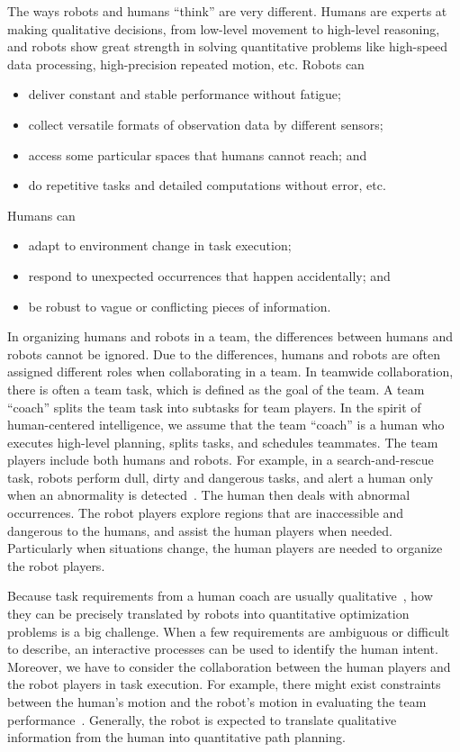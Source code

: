 \documentclass[phd]{byuprop}
\begin{document}
The ways robots and humans ``think'' are very different.
Humans are experts at making qualitative decisions, from low-level movement to high-level reasoning,
and robots show great strength in solving quantitative problems like high-speed data processing, high-precision repeated motion, etc.
Robots can
\begin{itemize}
\item deliver constant and stable performance without fatigue;
\item collect versatile formats of observation data by different sensors;
\item access some particular spaces that humans cannot reach; and
\item do repetitive tasks and detailed computations without error, etc.
\end{itemize}
Humans can
\begin{itemize}
\item adapt to environment change in task execution;
\item respond to unexpected occurrences that happen accidentally; and
\item be robust to vague or conflicting pieces of information. 
\end{itemize}
In organizing humans and robots in a team, the differences between humans and robots cannot be ignored.
Due to the differences, humans and robots are often assigned different roles when collaborating in a team.
In teamwide collaboration, there is often a team task, which is defined as the goal of the team.
A team ``coach'' splits the team task into subtasks for team players.
In the spirit of human-centered intelligence, we assume that the team ``coach'' is a human who executes high-level planning, splits tasks, and schedules teammates.
The team players include both humans and robots.
For example, in a search-and-rescue task, robots perform dull, dirty and dangerous tasks, and alert a human only when an abnormality is detected~\cite{Nourbakhsh2005}.
The human then deals with abnormal occurrences.
The robot players explore regions that are inaccessible and dangerous to the humans, and assist the human players when needed.
Particularly when situations change, the human players are needed to organize the robot players.

Because task requirements from a human coach are usually qualitative~\cite{brenner2007mediating}, how they can be precisely translated by robots into quantitative optimization problems is a big challenge.
When a few requirements are ambiguous or difficult to describe, an interactive processes can be used to identify the human intent.
Moreover, we have to consider the collaboration between the human players and the robot players in task execution.
For example, there might exist constraints between the human's motion and the robot's motion in evaluating the team performance~\cite{Yi2014a}.
Generally, the robot is expected to translate qualitative information from the human into quantitative path planning.
\end{document}
